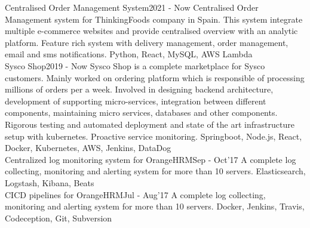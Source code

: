 

\begin{projects}
    \project
	{Centralised Order Management System}{2021 - Now}
	{}
	{
	    Centralised Order Management system for ThinkingFoods company in Spain. This system integrate multiple e-commerce websites and provide centralised overview with an analytic platform. Feature rich system with delivery management, order management, email and sms notifications.  
	}
	{Python, React, MySQL, AWS Lambda}
	\\	
	\project
	{Sysco Shop}{2019 - Now}
	{ }
	{
	   Sysco Shop is a complete marketplace for Sysco customers. Mainly worked on ordering platform which is
	    responsible of processing millions of orders per a week. Involved in designing backend architecture, development of supporting micro-services, integration between different components, maintaining micro services, databases and other components. Rigorous testing and automated deployment and state of the art infrastructure setup with kubernetes. Proactive service monitoring.  
	}
	{Springboot, Node.js, React, Docker, Kubernetes, AWS, Jenkins, DataDog}
	\\		
	\project
	{Centralized log monitoring system for OrangeHRM}{Sep - Oct’17}
	{}
	{
	    A complete log collecting, monitoring and alerting system for more
        than 10 servers.
	}
	{Elasticsearch, Logstash, Kibana, Beats}
	\\
	\project
	{CICD pipelines for OrangeHRM}{Jul - Aug’17}
	{ }
	{
	    A complete log collecting, monitoring and alerting system for more
        than 10 servers.
	}
	{Docker, Jenkins, Travis, Codeception, Git, Subversion}

\end{projects}